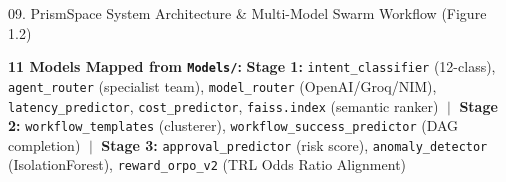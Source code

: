 \documentclass[aspectratio=169,10pt]{beamer}
\begin{document}
\begin{frame}[t]{09. PrismSpace System Architecture \& Multi-Model Swarm Workflow (Figure 1.2)}
{%
}
\vspace{-0.22cm}
\begin{tcolorbox}[
  width=0.99\linewidth, enhanced, arc=3pt,
  colframe=lavenderDark!65, colback=lavenderLight!35, boxrule=0.6pt,
  left=3pt, right=3pt, top=1.2pt, bottom=1.2pt
]
\centering
{\fontsize{4.1}{4.9}\selectfont\color{lavenderDark}
\textbf{11 Models Mapped from \texttt{Models/}:}
\textbf{Stage 1:} \texttt{intent\_classifier} (12-class), \texttt{agent\_router} (specialist team), \texttt{model\_router} (OpenAI/Groq/NIM), \texttt{latency\_predictor}, \texttt{cost\_predictor}, \texttt{faiss.index} (semantic ranker) $\;\vert\;$
\textbf{Stage 2:} \texttt{workflow\_templates} (clusterer), \texttt{workflow\_success\_predictor} (DAG completion) $\;\vert\;$
\textbf{Stage 3:} \texttt{approval\_predictor} (risk score), \texttt{anomaly\_detector} (IsolationForest), \texttt{reward\_orpo\_v2} (TRL Odds Ratio Alignment)
}
\end{tcolorbox}
\end{frame}
\end{document}
